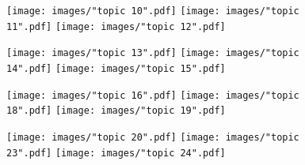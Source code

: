 \documentclass[a4paper]{article}
\begin{document}
	\begin{figure}[h]
		\texttt{[image: images/"topic 10".pdf]}
		\endminipage\hfill
		\texttt{[image: images/"topic 11".pdf]}
		\endminipage\hfill
		\texttt{[image: images/"topic 12".pdf]}
		\endminipage
	\end{figure}

	\begin{figure}[h]
		\texttt{[image: images/"topic 13".pdf]}
		\endminipage\hfill
		\texttt{[image: images/"topic 14".pdf]}
		\endminipage\hfill
		\texttt{[image: images/"topic 15".pdf]}
		\endminipage
	\end{figure}

	\begin{figure}[h]
		\texttt{[image: images/"topic 16".pdf]}
		\endminipage\hfill
		\texttt{[image: images/"topic 18".pdf]}
		\endminipage\hfill
		\texttt{[image: images/"topic 19".pdf]}
		\endminipage
	\end{figure}

	\begin{figure}[h]
		\texttt{[image: images/"topic 20".pdf]}
		\endminipage\hfill
		\texttt{[image: images/"topic 23".pdf]}
		\endminipage\hfill
		\texttt{[image: images/"topic 24".pdf]}
		\endminipage
	\end{figure}
	
\end{document}
